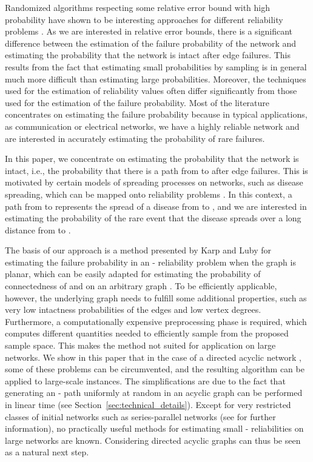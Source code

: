 \documentclass{article}
\begin{document}
Randomized algorithms respecting some
relative error bound with high probability have shown to be
interesting approaches for different reliability
problems
\cite{karp_1985_montecarlo,karger_1995_randomized,karger_1997_implementing}.
As we are interested in relative error
bounds, there is a significant difference between the
estimation of the failure probability of the network
and estimating the probability that the
network is intact after edge failures. This results from the
fact that estimating small probabilities by sampling is in
general much more difficult than estimating large probabilities.
Moreover, the techniques used for the estimation of reliability values
often differ significantly from those used for the estimation
of the failure probability.
Most of the literature concentrates on estimating the
failure probability because in typical applications, as
communication or electrical networks, we have a
highly reliable network and are interested in accurately estimating the
probability of rare failures.

In this paper, we concentrate on estimating the probability that the network is intact, i.e., the
probability that there is a path from  to  after edge
failures. This is motivated by certain models of spreading processes on networks, such as
disease spreading, which can be mapped onto reliability
problems \cite{grassberger_1983_critical,sander_2001_percolation,warren_2001_firewalls,newman_2002_spread,newman_2003_structure}. In this context,
a path from  to  represents the spread of
a disease from  to , and we are interested in estimating the
probability of the rare event that the disease spreads over a
long distance from  to  .

The basis of our approach is a method presented by Karp and Luby
\cite{karp_1985_montecarlo} for estimating the
failure probability in an - reliability problem when the
graph  is planar, which can be easily adapted for estimating the
probability of connectedness of  and  on an arbitrary graph .
To be efficiently applicable, however, the underlying graph 
needs to fulfill some additional properties, such as very low
intactness probabilities of the edges and low vertex degrees.
Furthermore, a computationally expensive preprocessing phase is
required, which computes different quantities needed to efficiently
sample from the proposed sample space. This makes the method not
suited for application on large networks. We show in
this paper that in the case of a directed acyclic network ,
some of these problems can be circumvented, and the resulting
algorithm can be applied to \mbox{large-scale} instances. The 
simplifications are due to the fact that generating
an - path uniformly at random in an acyclic graph can be
performed in linear time (see Section~\ref{sec:technical_details}). Except for very restricted classes of initial networks such
as series-parallel
networks (see \cite{satyanarayana_1985_lineartime} for
further information), no practically useful methods for estimating small
- reliabilities on large networks are known. Considering directed
acyclic graphs can thus be seen as a natural next step.
\end{document}
